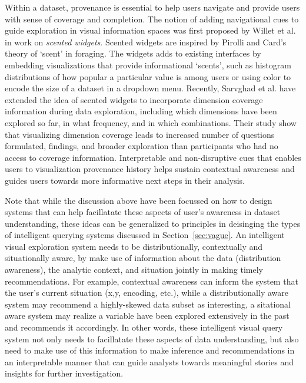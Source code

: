 \par Within a dataset, provenance is essential to help users navigate and provide users with sense of coverage and completion. The notion of adding navigational cues to guide exploration in visual information spaces was first proposed by Willet et al.\cite{Willett2007} in work on \textit{scented widgets}. Scented widgets are inspired by Pirolli and Card's theory of `scent' in foraging. The widgets adds to existing interfaces by embedding visualizations that provide informational `scents', such as histogram distributions of how popular a particular value is among users or using color to encode the size of a dataset in a dropdown menu. Recently, Sarvghad et al. \cite{Sarvghad2017} have extended the idea of scented widgets to incorporate dimension coverage information during data exploration, including which dimensions have been explored so far, in what frequency, and in which combinations. Their study show that visualizing dimension coverage leads to increased number of questions formulated, findings, and broader exploration than participants who had no access to coverage information. Interpretable and non-disruptive cues that enables users to visualization provenance history helps sustain contextual awareness and guides users towards more informative next steps in their analysis.

\par Note that while the discussion above have been focussed on how to design systems that can help facillatate these aspects of user's awareness in dataset understanding, these ideas can be generalized to principles in deisinging the types of intelligent querying systems discussed in Section~\ref{sec:vague}. An intelligent visual exploration system needs to be distributionally, contextually and situationally aware, by make use of information about the data (distribution awareness), the analytic context, and situation jointly in making timely recommendations. For example, contextual awareness can inform the system that the user's current situation (x,y, encoding, etc.), while a distributionally aware system may recommend a highly-skewed data subset as interesting, a sitational aware system may realize a variable have been explored extensively in the past and recommends it accordingly. In other words, these intelligent visual query system not only needs to facillatate these aspects of data understanding, but also need to make use of this information to make inference and recommendations in an interpretable manner that can guide analysts towards meaningful stories and insights for further investigation.

